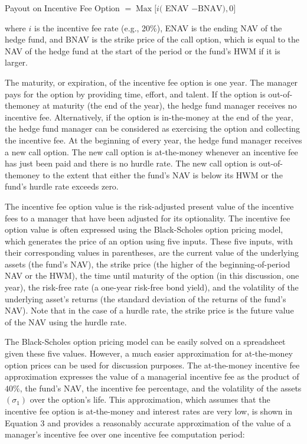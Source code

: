 \documentclass[11pt]{article}
\begin{document}
Payout on Incentive Fee Option $=\operatorname{Max}[i($ ENAV $-\mathrm{BNAV}), 0]$

where $i$ is the incentive fee rate (e.g., 20\%), ENAV is the ending NAV of the hedge fund, and BNAV is the strike price of the call option, which is equal to the NAV of the hedge fund at the start of the period or the fund's HWM if it is larger.

The maturity, or expiration, of the incentive fee option is one year. The manager pays for the option by providing time, effort, and talent. If the option is out-of-themoney at maturity (the end of the year), the hedge fund manager receives no incentive fee. Alternatively, if the option is in-the-money at the end of the year, the hedge fund manager can be considered as exercising the option and collecting the incentive fee. At the beginning of every year, the hedge fund manager receives a new call option. The new call option is at-the-money whenever an incentive fee has just been paid and there is no hurdle rate. The new call option is out-of-themoney to the extent that either the fund's NAV is below its HWM or the fund's hurdle rate exceeds zero.

The incentive fee option value is the risk-adjusted present value of the incentive fees to a manager that have been adjusted for its optionality. The incentive fee option value is often expressed using the Black-Scholes option pricing model, which generates the price of an option using five inputs. These five inputs, with their corresponding values in parentheses, are the current value of the underlying assets (the fund's NAV), the strike price (the higher of the beginning-of-period NAV or the HWM), the time until maturity of the option (in this discussion, one year), the risk-free rate (a one-year risk-free bond yield), and the volatility of the underlying asset's returns (the standard deviation of the returns of the fund's NAV). Note that in the case of a hurdle rate, the strike price is the future value of the NAV using the hurdle rate.

The Black-Scholes option pricing model can be easily solved on a spreadsheet given these five values. However, a much easier approximation for at-the-money option prices can be used for discussion purposes. The at-the-money incentive fee approximation expresses the value of a managerial incentive fee as the product of $40 \%$, the fund's NAV, the incentive fee percentage, and the volatility of the assets $\left(\sigma_{1}\right)$ over the option's life. This approximation, which assumes that the incentive fee option is at-the-money and interest rates are very low, is shown in Equation 3 and provides a reasonably accurate approximation of the value of a manager's incentive fee over one incentive fee computation period:
\end{document}
